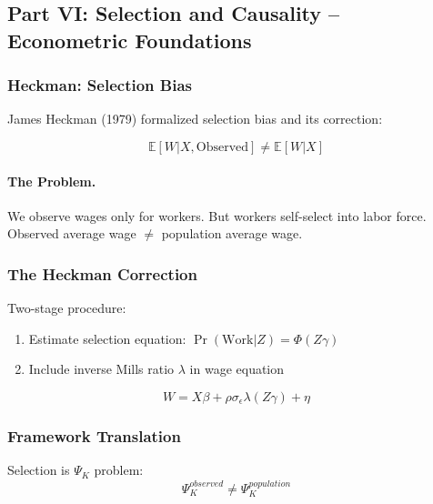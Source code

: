 \subsection{Part VI: Selection and Causality – Econometric Foundations}

\subsubsection{Heckman: Selection Bias}

James Heckman (1979) formalized selection bias and its correction:

\begin{equation}
\boxed{
\mathbb{E}[W | X, \text{Observed}] \neq \mathbb{E}[W | X]
}
\label{eq:heckman-selection}
\end{equation}

\paragraph{The Problem.}
We observe wages only for workers. But workers self-select into labor force.
Observed average wage $\neq$ population average wage.

\subsubsection{The Heckman Correction}

Two-stage procedure:
\begin{enumerate}
    \item Estimate selection equation: $\Pr(\text{Work} | Z) = \Phi(Z\gamma)$
    \item Include inverse Mills ratio $\lambda$ in wage equation
\end{enumerate}

\begin{equation}
W = X\beta + \rho\sigma_\epsilon \lambda(Z\gamma) + \eta
\end{equation}

\subsubsection{Framework Translation}

Selection is $\Psi_K$ problem:
\begin{equation}
\Psi_K^{observed} \neq \Psi_K^{population}
\end{equation}

